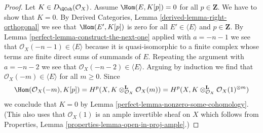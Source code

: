 \begin{proof}

Let $K \in D_\QCoh(\mathcal{O}_X)$. Assume
$\Hom(E, K[p]) = 0$ for all $p \in \mathbf{Z}$.
We have to show that $K = 0$.
By Derived Categories, Lemma
\ref{derived-lemma-right-orthogonal}
we see that $\Hom(E', K[p])$ is zero for all $E' \in \langle E \rangle$
and $p \in \mathbf{Z}$.
By Lemma \ref{perfect-lemma-construct-the-next-one}
applied with $a = -n - 1$
we see that $\mathcal{O}_X(-n - 1) \in \langle E \rangle$
because it is quasi-isomorphic to a finite complex
whose terms are finite direct sums of summands of $E$.
Repeating the argument with $a = -n - 2$ we see that
$\mathcal{O}_X(-n - 2) \in \langle E \rangle$.
Arguing by induction we find that $\mathcal{O}_X(-m) \in \langle E \rangle$
for all $m \geq 0$.
Since
$$
\Hom(\mathcal{O}_X(-m), K[p]) =
H^p(X, K \otimes_{\mathcal{O}_X}^\mathbf{L} \mathcal{O}_X(m)) =
H^p(X, K \otimes_{\mathcal{O}_X}^\mathbf{L} \mathcal{O}_X(1)^{\otimes m})
$$
we conclude that $K = 0$ by Lemma \ref{perfect-lemma-nonzero-some-cohomology}.
(This also uses that $\mathcal{O}_X(1)$ is an ample
invertible sheaf on $X$ which follows from
Properties, Lemma \ref{properties-lemma-open-in-proj-ample}.)
\end{proof}

